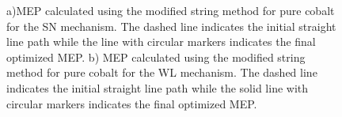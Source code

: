 \documentclass[preprint]{elsarticle}
\begin{document}
\begin{figure}[ht]
   \centering
   \caption{a)MEP calculated using the modified string method for pure cobalt for the SN mechanism. The
   dashed line indicates the initial straight line path while the  line with circular markers indicates the final optimized MEP. b) MEP calculated using the modified string method for pure cobalt for the WL mechanism. The
   dashed line indicates the initial straight line path while the solid line with circular markers indicates the final optimized MEP. }
   \label{fig:ren_MEP}
 \end{figure}
\end{document}
